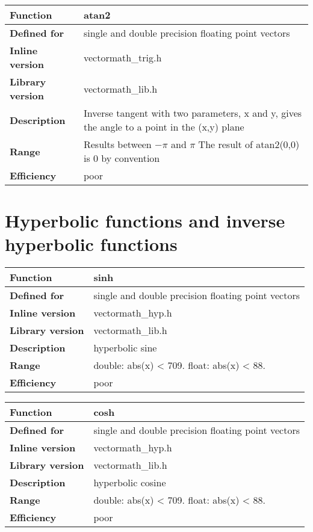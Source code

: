 \documentclass[vcl_manual.tex]{subfiles}
\begin{document}
\begin{tabular}{|p{30mm}|p{120mm}|}
\hline
\bfseries Function & atan2 \\ \hline
\bfseries Defined for & single and double precision floating point vectors \\ \hline
\bfseries Inline version & vectormath\_trig.h \\ \hline
\bfseries Library version & vectormath\_lib.h \\ \hline
\bfseries Description & Inverse tangent with two parameters, x and y, gives the angle to a point in the (x,y) plane \\ \hline
\bfseries Range & Results between $-\pi$ and $\pi$ \newline
The result of atan2(0,0) is 0 by convention\\ \hline
\bfseries Efficiency & poor \\ \hline
\end{tabular}


\section{Hyperbolic functions and inverse hyperbolic functions}\label{HyperbolicFunctions}

\begin{tabular}{|p{30mm}|p{120mm}|}
\hline
\bfseries Function & sinh \\ \hline
\bfseries Defined for & single and double precision floating point vectors \\ \hline
\bfseries Inline version & vectormath\_hyp.h \\ \hline
\bfseries Library version & vectormath\_lib.h \\ \hline
\bfseries Description & hyperbolic sine \\ \hline
\bfseries Range & double: abs(x) \textless{} 709. float: abs(x) \textless{} 88. \\ \hline
\bfseries Efficiency & poor \\ \hline
\end{tabular}


\begin{tabular}{|p{30mm}|p{120mm}|}
\hline
\bfseries Function & cosh \\ \hline
\bfseries Defined for & single and double precision floating point vectors \\ \hline
\bfseries Inline version & vectormath\_hyp.h \\ \hline
\bfseries Library version & vectormath\_lib.h \\ \hline
\bfseries Description & hyperbolic cosine \\ \hline
\bfseries Range & double: abs(x) \textless{} 709. float: abs(x) \textless{} 88. \\ \hline
\bfseries Efficiency & poor \\ \hline
\end{tabular}
\end{document}

